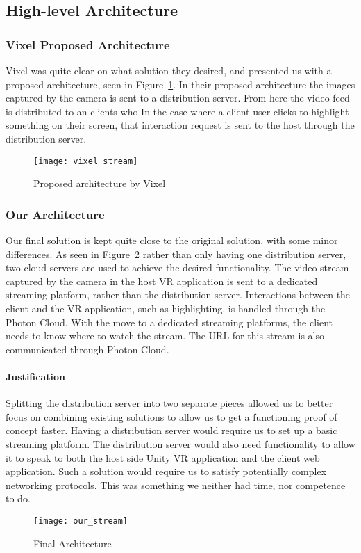 \subsection{High-level Architecture}
\subsubsection{Vixel Proposed Architecture}
Vixel was quite clear on what solution they desired, and presented us with a proposed architecture, seen in Figure~\ref{fig:proposed_architecture}. In their proposed architecture the images captured by the camera is sent to a distribution server. From here the video feed is distributed to an clients who 
In the case where a client user clicks to highlight something on their screen, that interaction request is sent to the host through the distribution server.


\begin{figure}
    \texttt{[image: vixel\_stream]}
    \caption{Proposed architecture by Vixel}
    \label{fig:proposed_architecture}
\end{figure}

\subsubsection{Our Architecture}
Our final solution is kept quite close to the original solution, with some minor differences. As seen in Figure~\ref{fig:our_architecture} rather than only having one distribution server, two cloud servers are used to achieve the desired functionality. The video stream captured by the camera in the host VR application is sent to a dedicated streaming platform, rather than the distribution server. Interactions between the client and the VR application, such as highlighting, is handled through the Photon Cloud. With the move to a dedicated streaming platforms, the client needs to know where to watch the stream. The URL for this stream is also communicated through Photon Cloud.

\paragraph{Justification}
Splitting the distribution server into two separate pieces allowed us to better focus on combining existing solutions to allow us to get a functioning proof of concept faster. Having a distribution server would require us to set up a basic streaming platform. The distribution server would also need functionality to allow it to speak to both the host side Unity VR application and the client web application. Such a solution would require us to satisfy potentially complex networking protocols. This was something we neither had time, nor competence to do.

\begin{figure}
    \texttt{[image: our\_stream]}
    \caption{Final Architecture}
    \label{fig:our_architecture}
\end{figure}

